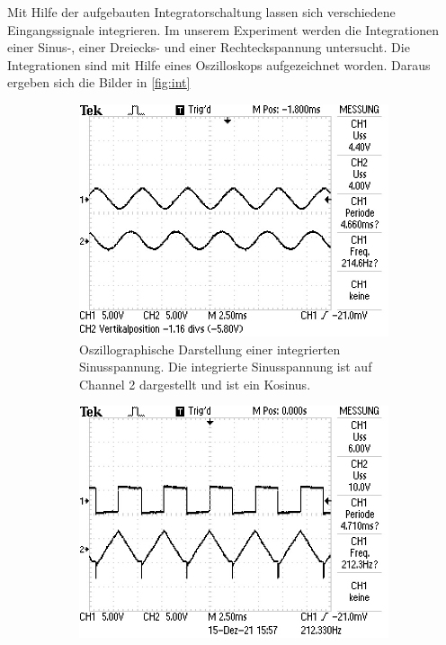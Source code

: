Mit Hilfe der aufgebauten Integratorschaltung lassen sich verschiedene Eingangssignale 
integrieren. 
Im unserem Experiment werden die Integrationen einer Sinus-, einer Dreiecks- und einer Rechteckspannung 
untersucht.
Die Integrationen sind mit Hilfe eines Oszilloskops aufgezeichnet worden.
Daraus ergeben sich die Bilder in \autoref{fig:int}
\begin{figure}
    \centering
    \begin{subfigure}[b]{0.45\textwidth}
        \centering
        \includegraphics[width=\textwidth]{data_of_others_cuz_ours_suck/int/int_sinus.JPG}
        \caption{Oszillographische Darstellung einer integrierten Sinusspannung.
        Die integrierte Sinusspannung ist auf Channel 2 dargestellt und ist ein Kosinus.}
        \label{fig:int_sin}
    \end{subfigure}
    \hfill
    \begin{subfigure}[b]{0.45\textwidth}
        \centering
        \includegraphics[width=\textwidth]{data_of_others_cuz_ours_suck/int/int_recht.JPG}

\end{subfigure}
\end{figure}
